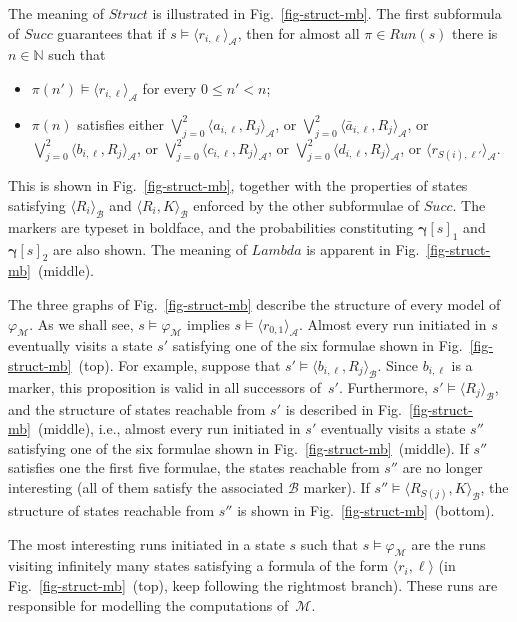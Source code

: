 \documentclass[a4paper,UKenglish,cleveref, autoref, thm-restate]{lipics-v2021}
\newcommand{\N}{\mathbb{N}}
\newcommand{\A}{\mathcal{A}}
\newcommand{\B}{\mathcal{B}}
\newcommand{\M}{\mathcal{M}}
\newcommand{\run}{\textit{Run}}
\newcommand{\ex}[1]{\langle #1 \rangle}
\newcommand{\Succ}{\mathit{Succ}}
\renewcommand{\vec}[1]{\pmb{#1}}
\newcommand{\Struct}{\textit{Struct}}
\newcommand{\FLambda}{\textit{Lambda}}
\newcommand{\cv}{\vec{\gamma}}
\begin{document}
The meaning of $\Struct$ is illustrated in Fig.~\ref{fig-struct-mb}. The first subformula of $\Succ$ guarantees that if $s \models \ex{r_{i,\ell}}_{\A}$, then for almost all $\pi \in \run(s)$ there is $n \in \N$ such that
\begin{itemize}
    \item $\pi(n') \models \ex{r_{i,\ell}}_\A$ for every $0 \leq n' <n$;
    \item $\pi(n)$ satisfies either $\bigvee_{j=0}^2\ex{a_{i,\ell},R_j}_{\A}$, or 
$\bigvee_{j=0}^2\ex{\bar{a}_{i,\ell},R_j}_{\A}$, or
$\bigvee_{j=0}^2\ex{b_{i,\ell}, R_j}_{\A}$, or 
$\bigvee_{j=0}^2\ex{c_{i,\ell},R_j}_{\A}$, or 
$\bigvee_{j=0}^2\ex{d_{i,\ell},R_j}_{\A}$, or $\ex{r_{S(i),\ell'}}_{\A}$.
\end{itemize}
This is shown in Fig.~\ref{fig-struct-mb}, together with the properties of states satisfying $\ex{R_i}_\B$ and $\ex{R_i,K}_\B$ enforced by the other subformulae of $\Succ$. The markers are typeset in boldface, and the probabilities constituting $\cv[s]_1$ and $\cv[s]_2$ are also shown. The meaning of $\FLambda$ is apparent in Fig.~\ref{fig-struct-mb}~(middle).

The three graphs of Fig.~\ref{fig-struct-mb} describe the structure of every model of $\varphi_\M$. As we shall see, $s \models \varphi_\M$ implies $s \models \ex{r_{0,1}}_\A$. Almost every run initiated in $s$ eventually visits a state $s'$ satisfying one of the six formulae shown in Fig.~\ref{fig-struct-mb}~(top). For example, suppose that $s' \models \ex{b_{i,\ell}, R_j}_\B$. Since $b_{i,\ell}$ is a marker, this proposition is valid in all successors of~$s'$. Furthermore, $s' \models \ex{R_j}_\B$, and the structure of states reachable from $s'$ is described in Fig.~\ref{fig-struct-mb}~(middle), i.e., almost every run initiated in $s'$ eventually visits a state $s''$ satisfying one of the six formulae shown in Fig.~\ref{fig-struct-mb}~(middle). If $s''$ satisfies one the first five formulae, the states reachable from $s''$ are no longer interesting (all of them satisfy the associated $\B$ marker). If $s'' \models \ex{R_{S(j)},K}_\B$, the structure of states reachable from $s''$ is shown in Fig.~\ref{fig-struct-mb}~(bottom).

The most interesting runs initiated in a state $s$ such that $s \models\varphi_\M$ are the runs visiting infinitely many states satisfying a formula of the form $\ex{r_{i},\ell}$ (in Fig.~\ref{fig-struct-mb}~(top), keep following the rightmost branch). These runs are responsible for modelling the computations of~$\M$.
\end{document}
